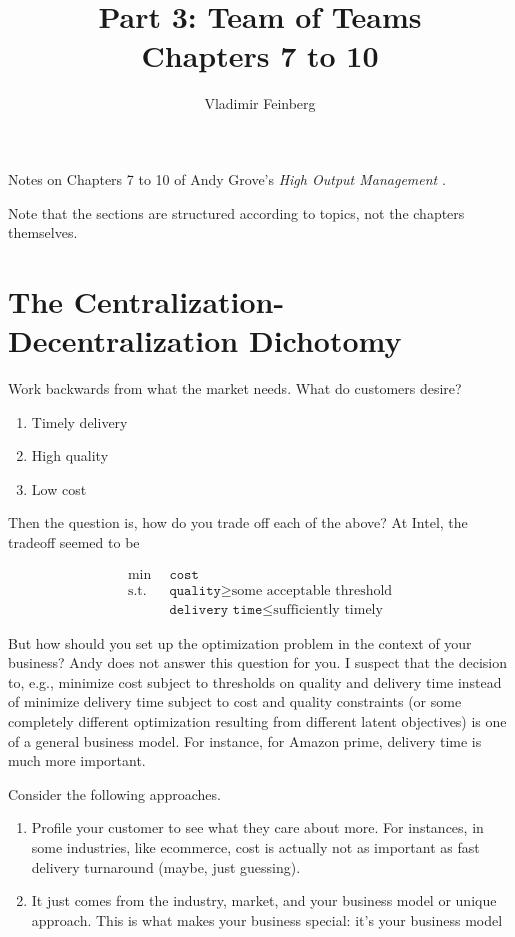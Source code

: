 \documentclass{article}
\title{Part 3: Team of Teams\\Chapters 7 to 10}
\author{Vladimir Feinberg}
\begin{document}
\maketitle

Notes on Chapters 7 to 10 of Andy Grove's \textit{High Output Management} \cite{highoutput}.

Note that the sections are structured according to topics, not the chapters themselves.

\section{The Centralization-Decentralization Dichotomy}

Work backwards from what the market needs. What do customers desire?

\begin{enumerate}
\item Timely delivery
\item High quality
\item Low cost
\end{enumerate}

Then the question is, how do you trade off each of the above? At Intel, the tradeoff seemed to be

\begin{align*} 
  \min \,\,\,& \texttt{cost}\\
  \text{s.t.}\,\,\, & \texttt{quality}\ge \text{some acceptable threshold} \\
 & \texttt{delivery time}\le \text{sufficiently timely}
\end{align*}

But how should you set up the optimization problem in the context of your business? Andy does not answer this question for you. I suspect that the decision to, e.g., minimize cost subject to thresholds on quality and delivery time instead of minimize delivery time subject to cost and quality constraints (or some completely different optimization resulting from different latent objectives) is one of a general business model. For instance, for Amazon prime, delivery time is much more important.

Consider the following approaches.
\begin{enumerate}
\item Profile your customer to see what they care about more. For instances, in some industries, like ecommerce, cost is actually not as important as fast delivery turnaround (maybe, just guessing).
\item It just comes from the industry, market, and your business model or unique approach. This is what makes your business special: it's your business model
\end{enumerate}
\end{document}
